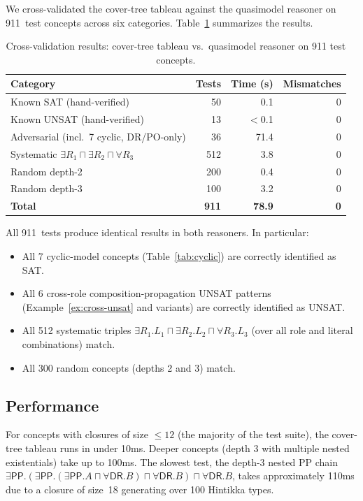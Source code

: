 \documentclass[a4paper,11pt]{article}
\theoremstyle{definition}
\newcommand{\DR}{\ensuremath{\mathsf{DR}}}
\newcommand{\PP}{\ensuremath{\mathsf{PP}}}
\begin{document}
We cross-validated the cover-tree tableau against the quasimodel
reasoner on 911~test concepts across six categories.
Table~\ref{tab:results} summarizes the results.

\begin{table}[ht]
\centering
\caption{Cross-validation results: cover-tree tableau vs.\
  quasimodel reasoner on 911 test concepts.}
\label{tab:results}
\renewcommand{\arraystretch}{1.2}
\begin{tabular}{lrrr}
\toprule
Category & Tests & Time (s) & Mismatches \\
\midrule
Known SAT (hand-verified) & 50 & 0.1 & 0 \\
Known UNSAT (hand-verified) & 13 & $<$0.1 & 0 \\
Adversarial (incl.\ 7 cyclic, DR/PO-only) & 36 & 71.4 & 0 \\
Systematic $\exists R_1 \sqcap \exists R_2 \sqcap \forall R_3$
  & 512 & 3.8 & 0 \\
Random depth-2 & 200 & 0.4 & 0 \\
Random depth-3 & 100 & 3.2 & 0 \\
\midrule
\textbf{Total} & \textbf{911} & \textbf{78.9} & \textbf{0} \\
\bottomrule
\end{tabular}
\end{table}

All 911~tests produce identical results in both reasoners.
In particular:
\begin{itemize}[nosep]
  \item All 7 cyclic-model concepts
    (Table~\ref{tab:cyclic}) are correctly identified as SAT.
  \item All 6 cross-role composition-propagation UNSAT patterns
    (Example~\ref{ex:cross-unsat} and variants) are correctly
    identified as UNSAT.
  \item All 512 systematic triples
    $\exists R_1.L_1 \sqcap \exists R_2.L_2 \sqcap \forall R_3.L_3$
    (over all role and literal combinations) match.
  \item All 300 random concepts (depths 2 and 3) match.
\end{itemize}

\subsection{Performance}

For concepts with closures of size $\leq 12$ (the majority of
the test suite), the cover-tree tableau runs in under 10ms.
Deeper concepts (depth 3 with multiple nested existentials) take
up to 100ms.  The slowest test, the depth-3 nested PP chain
$\exists\PP.(\exists\PP.(\exists\PP.A \sqcap \forall\DR.B)
\sqcap \forall\DR.B) \sqcap \forall\DR.B$,
takes approximately 110ms due to a closure of size~18 generating
over 100 Hintikka types.
\end{document}
